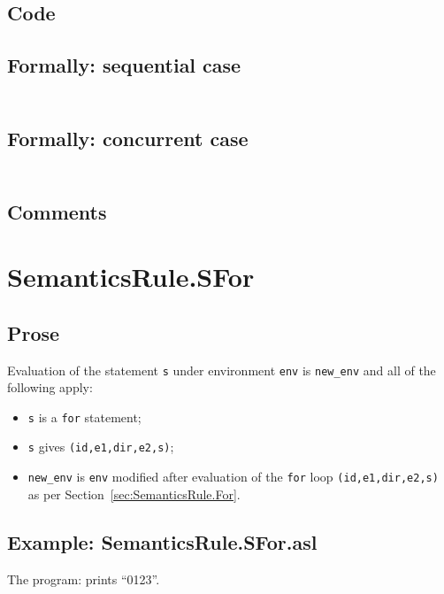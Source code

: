 \documentclass{book}
\begin{document}
  \subsection{Code}

  \subsection{Formally: sequential case}
  \begin{align}
  \end{align} 

  \subsection{Formally: concurrent case}
  \begin{align}
  \end{align} 

    \subsection{Comments}

\section{SemanticsRule.SFor \label{sec:SemanticsRule.SFor}}

    \subsection{Prose}
  Evaluation of the statement \texttt{s} under environment \texttt{env} is
\texttt{new\_env} and all of the following apply:
    \begin{itemize}
    \item \texttt{s} is a \texttt{for} statement;
    \item \texttt{s} gives \texttt{(id,e1,dir,e2,s)};
    \item \texttt{new\_env} is \texttt{env} modified after evaluation of the \texttt{for} loop \texttt{(id,e1,dir,e2,s)} as per Section~\ref{sec:SemanticsRule.For}. 
    \end{itemize}

    \subsection{Example: SemanticsRule.SFor.asl}
    The program:
    prints ``0123''.
\end{document}
